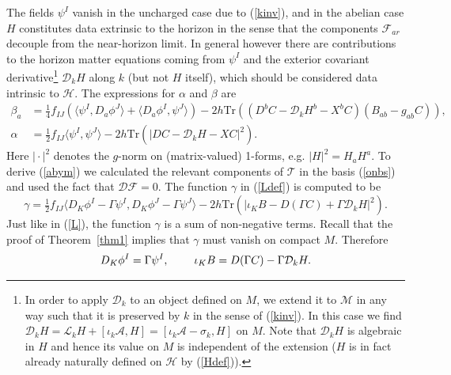 \documentclass[11pt, reqno]{amsart}
\theoremstyle{plain}
\theoremstyle{definition}
\numberwithin{equation}{section}
\begin{document}
The fields $\psi^I$ vanish in the uncharged case due to (\ref{kinv}), and in the abelian case $H$ constitutes data extrinsic to the horizon in the sense that the components $\mathcal{F}_{ar}$ decouple from the near-horizon limit. In general however there are contributions to the horizon matter equations coming from $\psi^I$ and the exterior covariant derivative\footnote{In order to apply $\mathcal{D}_k$ to an object defined on $M$, we extend it to $\mathcal{M}$ in any way such that it is preserved by $k$ in the sense of (\ref{kinv}). In this case we find $\mathcal{D}_k H = \mathcal{L}_kH + [\iota_k \mathcal{A},H] = [\iota_k \mathcal{A}-\sigma_k,H]$ on $M$. Note that $\mathcal{D}_k H$ is algebraic in $H$ and hence its value on $M$ is independent of the extension ($H$ is in fact already naturally defined on $\mathcal{H}$ by (\ref{Hdef})).} $\mathcal{D}_k H$ along $k$ (but not $H$ itself), which should be considered data intrinsic to $\mathcal{H}$. 
The  expressions for $\alpha$ and $\beta$ are 
\begin{subequations}\label{abym}
\begin{align} 
    \beta_a &= \frac 14f_{IJ}(\langle \psi^I, D_a\phi^J\rangle + \langle D_a\phi^I,\psi^J\rangle)- 2h\text{Tr}\left((D^bC - \mathcal{D}_kH^b - X^bC)(B_{ab} - g_{ab}C)\right), \\
    \alpha &= \frac 12f_{IJ}\langle \psi^I, \psi^J\rangle - 2h\text{Tr}\left(\vert DC - \mathcal{D}_kH - XC\vert^2\right). \label{alphaex2}
\end{align}
\end{subequations}
Here $\vert \cdot \vert^2$ denotes the $g$-norm on (matrix-valued) 1-forms, e.g. $\vert H \vert^2 = H_aH^a$. To derive (\ref{abym}) we calculated the relevant components of $\mathcal{T}$ in the basis (\ref{onbs}) and used the fact that $\mathcal{D}\mathcal{F} = 0$. The function $\gamma$ in (\ref{Ldef}) is computed to be
\begin{equation} \label{gamma2}
    \gamma = \tfrac 12f_{IJ}\langle D_K\phi^I - \Gamma \psi^I,D_K\phi^J - \Gamma \psi^J\rangle - 2h\text{Tr}\left( \vert \iota_K B - D(\Gamma C) + \Gamma \mathcal{D}_kH\vert^2\right).
\end{equation}
Just like in (\ref{L}), the function $\gamma$ is a sum of non-negative terms. Recall that the proof of Theorem~\ref{thm1} implies that $\gamma$ must vanish on compact $M$. Therefore 
\begin{equation} \label{fint}
    D_K\phi^I = \Gamma \psi^I, \hspace{.8cm} \iota_K B = D(\Gamma C) - \Gamma\mathcal{D}_k H.
\end{equation}
\end{document}
